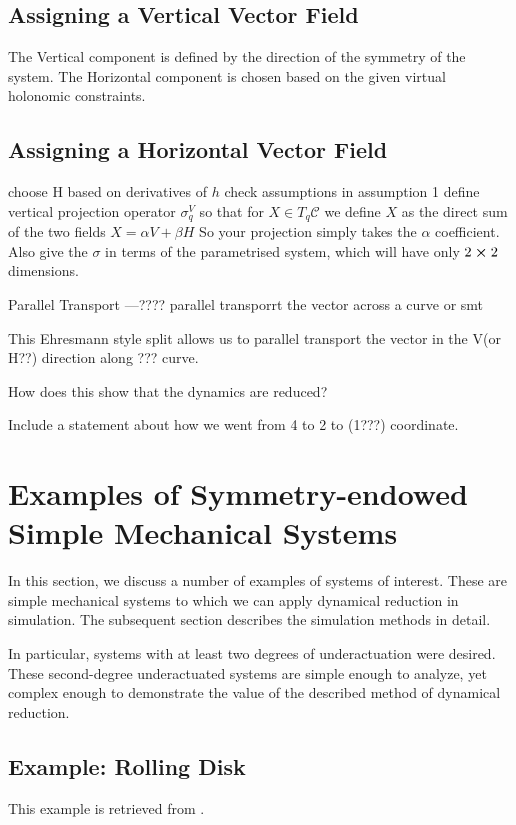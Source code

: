 \documentclass[main.tex]{subfiles}
\begin{document}
\subsection{Assigning a Vertical Vector Field}
The Vertical component is defined by the direction of the symmetry of the system. The Horizontal component is chosen based on the given virtual holonomic constraints.

\subsection{Assigning a Horizontal Vector Field}
choose H based on derivatives of $h$
check assumptions in assumption 1
define vertical projection operator $\sigma^V_q$ 
so that for 
$X\in T_q\mathcal{C}$
we define $X$ as the direct sum of the two fields
$X=\alpha V+\beta H$
So your projection simply takes the $\alpha$ coefficient.
Also give the $\sigma$ in terms of the parametrised system, which will have only $2\cross2$ dimensions.

Parallel Transport
---????
parallel transporrt the vector across a curve or smt

This Ehresmann style split allows us to parallel transport the vector in the V(or H??) direction along ??? curve.

How does this show that the dynamics are reduced?

Include a statement about how we went from 4 to 2 to (1???) coordinate.





\section{Examples of Symmetry-endowed Simple Mechanical Systems}
In this section, we discuss a number of examples of systems of interest. These are simple mechanical systems to which we can apply dynamical reduction in simulation. The subsequent section describes the simulation methods in detail.

In particular, systems with at least two degrees of underactuation were desired. These second-degree underactuated systems are simple enough to analyze, yet complex enough to demonstrate the value of the described method of dynamical reduction.

\subsection{Example: Rolling Disk}
This example is retrieved from \cite[9]{bullo2019geometric}.
\end{document}
